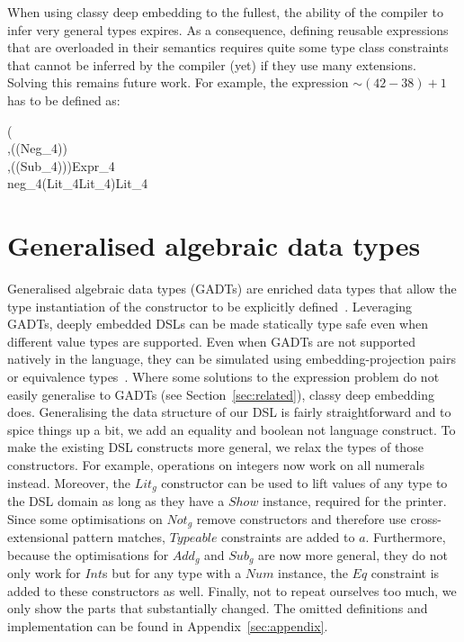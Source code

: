\documentclass[runningheads]{llncs}
\newcommand{\Conid}[1]{\mathit{#1}}
\newcommand{\Varid}[1]{\mathit{#1}}
\def\resethooks{%
  \global\let\SaveRestoreHook\empty
  \global\let\ColumnHook\empty}
\let\hspre\empty
\let\hspost\empty
\begin{document}
When using classy deep embedding to the fullest, the ability of the compiler to infer very general types expires.
As a consequence, defining reusable expressions that are overloaded in their semantics requires quite some type class constraints that cannot be inferred by the compiler (yet) if they use many extensions.
Solving this remains future work.
For example, the expression $\sim(42-38)+1$ has to be defined as:

\begin{hscode}\SaveRestoreHook
\column{B}{@{}>{\hspre}l<{\hspost}@{}}%
\column{8}{@{}>{\hspre}l<{\hspost}@{}}%
\column{E}{@{}>{\hspre}l<{\hspost}@{}}%
\>[B]{}\Varid{e3}\mathbin{::}{}\<[8]%
\>[8]{}(\Conid{Typeable}\;\Varid{d}{}\<[E]%
\\
\>[8]{},\Conid{GDict}\;(\Varid{d}\;(Neg_4\;\Varid{d})){}\<[E]%
\\
\>[8]{},\Conid{GDict}\;(\Varid{d}\;(Sub_4\;\Varid{d})))\Rightarrow Expr_4\;\Varid{d}{}\<[E]%
\\
\>[B]{}\Varid{e3}\mathrel{=}neg_4\;(Lit_4\;Lit_4\;)Lit_4\;\<[E]%
\ColumnHook
\end{hscode}\resethooks

\section{Generalised algebraic data types}%
\label{sec:generalisation}
Generalised algebraic data types (GADTs) are enriched data types that allow the type instantiation of the constructor to be explicitly defined~\cite{cheney_first-class_2003,hinze_fun_2003}.
Leveraging GADTs, deeply embedded DSLs can be made statically type safe even when different value types are supported.
Even when GADTs are not supported natively in the language, they can be simulated using embedding-projection pairs or equivalence types~\cite[Sec.~2.2]{cheney_lightweight_2002}.
Where some solutions to the expression problem do not easily generalise to GADTs (see Section~\ref{sec:related}), classy deep embedding does.
Generalising the data structure of our DSL is fairly straightforward and to spice things up a bit, we add an equality and boolean not language construct.
To make the existing DSL constructs more general, we relax the types of those constructors.
For example, operations on integers now work on all numerals instead.
Moreover, the \ensuremath{Lit_g} constructor can be used to lift values of any type to the DSL domain as long as they have a \ensuremath{\Conid{Show}} instance, required for the printer.
Since some optimisations on \ensuremath{Not_g} remove constructors and therefore use cross-extensional pattern matches, \ensuremath{\Conid{Typeable}} constraints are added to \ensuremath{\Varid{a}}.
Furthermore, because the optimisations for \ensuremath{Add_g} and \ensuremath{Sub_g} are now more general, they do not only work for \ensuremath{\Conid{Int}}s but for any type with a \ensuremath{\Conid{Num}} instance, the \ensuremath{\Conid{Eq}} constraint is added to these constructors as well.
Finally, not to repeat ourselves too much, we only show the parts that substantially changed.
The omitted definitions and implementation can be found in Appendix~\ref{sec:appendix}.
\end{document}
